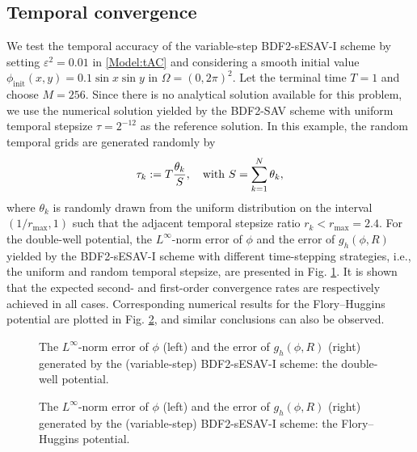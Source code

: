 \documentclass{m2an}
\begin{document}
\subsection{Temporal convergence}
We test the temporal accuracy of the variable-step BDF2-sESAV-I scheme by setting $ \varepsilon^2 = 0.01 $ in \eqref{Model:tAC} and considering a smooth initial value
$
\phi_{\text {init}} ( x, y ) = 0.1 \sin x \sin y$  in $\Omega = (0,2\pi)^2.
$
Let the terminal time $ T = 1 $ and choose $ M = 256 $. Since there is no analytical solution available for this problem, we use the numerical solution yielded by the BDF2-SAV scheme \cite{JSC_Qiao_2023} with uniform temporal stepsize $ \tau = 2^{-12} $ as the reference solution. In this example, the random temporal grids are generated randomly by
$$
\tau_{k} := T \frac{\theta_{k}}{S}, \quad {\rm with } \  S = \sum^{N}_{k=1} \theta_{k}, 
$$
where $ \theta_{k} $ is randomly drawn from the uniform distribution on the interval $ ( 1/r_{\max}, 1 ) $ such that the adjacent temporal stepsize ratio $ r_{k} < r_{\max} = 2.4 $. For the double-well potential, the $L^{\infty}$-norm error of $ \phi $ and the error of $g_h(\phi,R)$ yielded by the BDF2-sESAV-I scheme with different time-stepping strategies, i.e., the uniform and random temporal stepsize, are presented in Fig. \ref{figEx1_1}. It is shown that the expected second- and first-order convergence rates are respectively achieved in all cases. Corresponding numerical results for the Flory--Huggins potential are plotted in Fig. \ref{figEx1_2}, and similar conclusions can also be observed.
\begin{figure}[!h]
	\vspace{-12pt}
	\centering
	\setlength{\abovecaptionskip}{0.0cm} 
	\setlength{\belowcaptionskip}{0.0cm}
	\caption{The $L^{\infty}$-norm error of $ \phi $ (left) and the error of $g_h(\phi,R)$ (right)  generated by the (variable-step) BDF2-sESAV-I scheme: the double-well potential.}	
	\label{figEx1_1}
\end{figure}
\begin{figure}[!h]
	\vspace{-12pt}
	\centering
	\setlength{\abovecaptionskip}{0.0cm} 
	\setlength{\belowcaptionskip}{0.0cm}
	\caption{The $L^{\infty}$-norm error of $ \phi $ (left) and the error of $g_h(\phi,R)$ (right) generated by the (variable-step) BDF2-sESAV-I scheme: the Flory--Huggins potential.}	
	\label{figEx1_2}
\end{figure}
\end{document}
